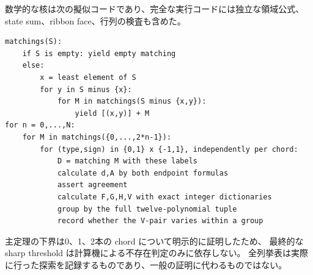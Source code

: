 \documentclass[12pt]{amsart}
\theoremstyle{definition}
\theoremstyle{remark}
\numberwithin{equation}{section}
\begin{document}
数学的な核は次の擬似コードであり、完全な実行コードには独立な領域公式、
state sum、ribbon face、行列の検査も含めた。
\par\noindent\begin{minipage}{\linewidth}
\begin{lstlisting}
matchings(S):
    if S is empty: yield empty matching
    else:
        x = least element of S
        for y in S minus {x}:
            for M in matchings(S minus {x,y}):
                yield [(x,y)] + M
for n = 0,...,N:
    for M in matchings({0,...,2*n-1}):
        for (type,sign) in {0,1} x {-1,1}, independently per chord:
            D = matching M with these labels
            calculate d,A by both endpoint formulas
            assert agreement
            calculate F,G,H,V with exact integer dictionaries
            group by the full twelve-polynomial tuple
            record whether the V-pair varies within a group
\end{lstlisting}
\end{minipage}\par
主定理の下界は0、1、2本の chord について明示的に証明したため、
最終的な sharp threshold は計算機による不存在判定のみに依存しない。
全列挙表は実際に行った探索を記録するものであり、一般の証明に代わるものではない。
\endgroup
\end{document}
